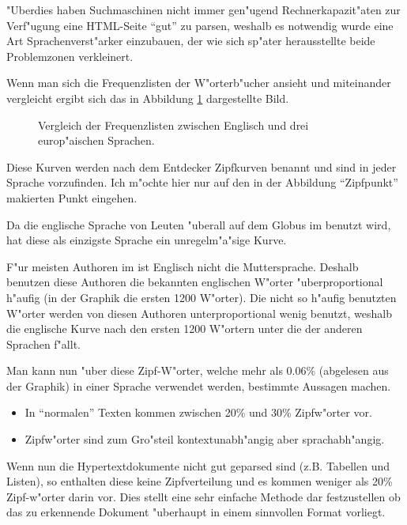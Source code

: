 "Uberdies haben Suchmaschinen nicht immer gen"ugend Rechnerkapazit"aten zur Verf"ugung eine HTML-Seite "`gut"' zu parsen, weshalb es notwendig wurde eine Art Sprachenverst"arker einzubauen, der wie sich sp"ater herausstellte beide Problemzonen verkleinert.

Wenn man sich die Frequenzlisten der W"orterb"ucher ansieht und miteinander vergleicht ergibt sich das in Abbildung \ref{frequenzdiagramm} dargestellte Bild. 

\begin{figure}[t]
	\caption{Vergleich der Frequenzlisten zwischen Englisch und drei europ"aischen Sprachen.}
	\label{frequenzdiagramm}
\end{figure}

Diese Kurven werden nach dem Entdecker Zipfkurven\cite{Zipf1949} benannt und sind in jeder Sprache vorzufinden. Ich m"ochte hier nur auf den in der Abbildung "`Zipfpunkt"' makierten Punkt eingehen.

Da die englische Sprache von Leuten "uberall auf dem Globus im \www benutzt wird, hat diese als einzigste Sprache ein unregelm"a"sige Kurve.

F"ur meisten Authoren im \www ist Englisch nicht die Muttersprache. Deshalb benutzen diese Authoren die bekannten englischen W"orter "uberproportional h"aufig (in der Graphik die ersten 1200 W"orter). Die nicht so h"aufig benutzten W"orter werden von diesen Authoren unterproportional wenig benutzt, weshalb die englische Kurve nach den ersten 1200 W"ortern unter die der anderen Sprachen f"allt.

Man kann nun "uber diese Zipf-W"orter, welche mehr als 0.06\% (abgelesen aus der Graphik) in einer Sprache verwendet werden, bestimmte Aussagen machen. 

\begin{itemize}
\item In "`normalen"' Texten kommen zwischen 20\% und 30\% Zipfw"orter vor.
\item Zipfw"orter sind zum Gro"steil kontextunabh"angig aber sprachabh"angig.
\end{itemize}

Wenn nun die Hypertextdokumente nicht gut geparsed sind (z.B. Tabellen und Listen), so enthalten diese keine Zipfverteilung und es kommen weniger als 20\% Zipf-w"orter darin vor. Dies stellt eine sehr einfache Methode dar festzustellen ob das zu erkennende Dokument "uberhaupt in einem sinnvollen Format vorliegt.

